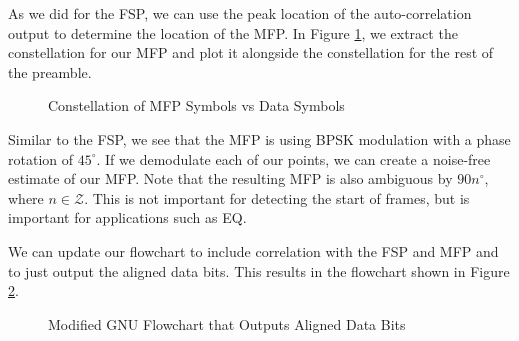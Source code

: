 \documentclass[conference,onecolumn]{IEEEtran}
\begin{document}
\noindent As we did for the FSP, we can use the peak location of the auto-correlation output to determine the location of the MFP. In Figure \ref{fig::mfp_constellation}, we extract the constellation for our MFP and plot it alongside the constellation for the rest of the preamble.

\begin{figure}[H]
	\centerline{}
	\caption{Constellation of MFP Symbols vs Data Symbols}
	\label{fig::mfp_constellation}
\end{figure}

\noindent Similar to the FSP, we see that the MFP is using BPSK modulation with a phase rotation of $45^{\circ}$. If we demodulate each of our points, we can create a noise-free estimate of our MFP. Note that the resulting MFP is also ambiguous by $90n^{\circ}$, where $n \in \mathcal{Z}$. This is not important for detecting the start of frames, but is important for applications such as EQ.

We can update our flowchart to include correlation with the FSP and MFP and to just output the aligned data bits. This results in the flowchart shown in Figure \ref{fig::frame_align}.

\begin{figure}[H]
	\centerline{}
	\caption{Modified GNU Flowchart that Outputs Aligned Data Bits}
	\label{fig::frame_align}
\end{figure}
\end{document}

